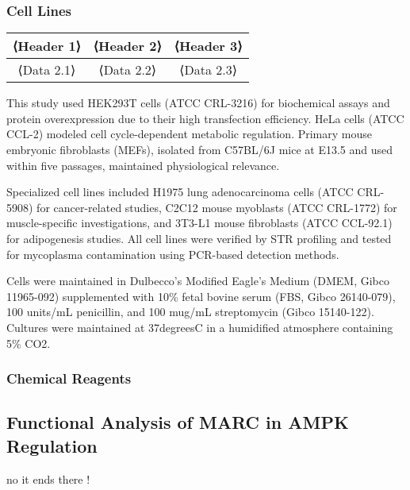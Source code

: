 \documentclass[11pt,a4paper]{article}
\begin{document}
\subsubsection{Cell Lines}

\begin{tabular}{|c|c|c|}
    \hline
    \textbf{⟨Header 1⟩} & \textbf{⟨Header 2⟩} & \textbf{⟨Header 3⟩} \\
    \hline
    ⟨Data 2.1⟩ & ⟨Data 2.2⟩ & ⟨Data 2.3⟩ \\
    \hline
\end{tabular}

This study used HEK293T cells (ATCC CRL-3216) for biochemical assays and protein overexpression due to their high transfection efficiency. HeLa cells (ATCC CCL-2) modeled cell cycle-dependent metabolic regulation. Primary mouse embryonic fibroblasts (MEFs), isolated from C57BL/6J mice at E13.5 and used within five passages, maintained physiological relevance.

Specialized cell lines included H1975 lung adenocarcinoma cells (ATCC CRL-5908) for cancer-related studies, C2C12 mouse myoblasts (ATCC CRL-1772) for muscle-specific investigations, and 3T3-L1 mouse fibroblasts (ATCC CCL-92.1) for adipogenesis studies. All cell lines were verified by STR profiling and tested for mycoplasma contamination using PCR-based detection methods.

Cells were maintained in Dulbecco's Modified Eagle's Medium (DMEM, Gibco 11965-092) supplemented with 10\% fetal bovine serum (FBS, Gibco 26140-079), 100 units/mL penicillin, and 100 mug/mL streptomycin (Gibco 15140-122). Cultures were maintained at 37degreesC in a humidified atmosphere containing 5\% CO2.

\subsubsection{Chemical Reagents}

\subsection{Functional Analysis of MARC in AMPK Regulation}

no it ends there !
\end{document}
